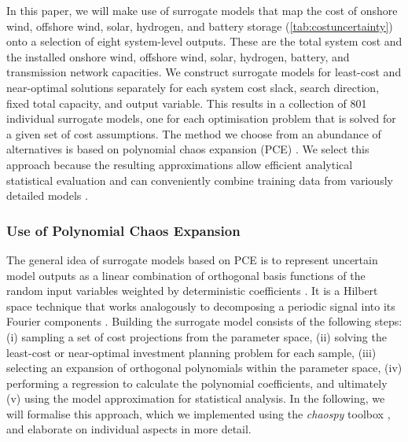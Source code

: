 
In this paper, we will make use of surrogate models that map the
cost of onshore wind, offshore wind, solar, hydrogen, and battery storage (\cref{tab:costuncertainty})
onto a selection of eight system-level outputs.
These are the total system cost and the installed onshore wind, offshore wind, solar, hydrogen, battery, and transmission network capacities.
We construct surrogate models for least-cost and near-optimal solutions separately
for each system cost slack, search direction, fixed total capacity, and output variable. This results in a collection of 801 individual surrogate models, one for each optimisation problem that is solved
for a given set of cost assumptions.
The method we choose from an abundance of alternatives is based on polynomial chaos expansion (PCE)
\cite{sudret_global_2008,fajraoui_optimal_2017,gratiet_metamodel-based_2015}.
We select this approach because the resulting approximations
allow efficient analytical statistical evaluation \cite{sudret_global_2008} and
can conveniently combine training data from variously detailed models \cite{palar_multi-fidelity_2016}.

\subsubsection{Use of Polynomial Chaos Expansion}
\label{sec:pce}


The general idea of surrogate models based on PCE is to
represent uncertain model outputs as a linear combination of orthogonal basis functions 
of the random input variables weighted by deterministic coefficients \cite{muhlpfordt_uncertainty_2020}.
It is a Hilbert space technique that works analogously to decomposing a periodic signal into its Fourier components \cite{muhlpfordt_uncertainty_2020}.
Building the surrogate model consists of the following steps:
(i) sampling a set of cost projections from the parameter space,
(ii) solving the least-cost or near-optimal investment planning problem for each sample,
(iii) selecting an expansion of orthogonal polynomials within the parameter space,
(iv) performing a regression to calculate the polynomial coefficients, and ultimately
(v) using the model approximation for statistical analysis.
In the following, we will formalise this approach,
which we implemented using the \textit{chaospy} toolbox \cite{feinberg_chaospy_2015},
and elaborate on individual aspects in more detail.

